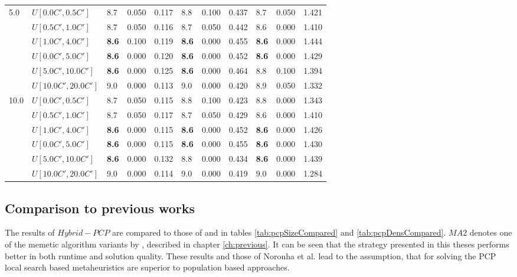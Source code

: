 \begin{table}[h]
{\begin{tabular}{|l|l||l|l|l||l|l|l||l|l|l|}
      \hline\hline
      \multirow{6}{*}{5.0} & $U[0.0C',0.5C']$ & 8.7 & 0.050 & 0.117 & 8.8 & 0.100 & 0.437 & 8.7 & 0.050 & 1.421 \\
       & $U[0.5C',1.0C']$ & 8.7 & 0.050 & 0.116 & 8.7 & 0.050 & 0.442 & 8.6 & 0.000 & 1.410 \\
       & $U[1.0C',4.0C']$ & \textbf{8.6} & 0.100 & 0.119 & \textbf{8.6} & 0.000 & 0.455 & \textbf{8.6} & 0.000 & 1.444 \\
       & $U[0.0C',5.0C']$ & \textbf{8.6} & 0.000 & 0.120 & \textbf{8.6} & 0.000 & 0.452 & \textbf{8.6} & 0.000 & 1.429 \\
       & $U[5.0C',10.0C']$ & \textbf{8.6} & 0.000 & 0.125 & \textbf{8.6} & 0.000 & 0.464 & 8.8 & 0.100 & 1.394 \\
       & $U[10.0C',20.0C']$ & 9.0 & 0.000 & 0.113 & 9.0 & 0.000 & 0.420 & 8.9 & 0.050 & 1.332 \\
      \hline\hline
      \multirow{6}{*}{10.0} & $U[0.0C',0.5C']$ & 8.7 & 0.050 & 0.115 & 8.8 & 0.100 & 0.423 & 8.8 & 0.000 & 1.343 \\
       & $U[0.5C',1.0C']$ & 8.7 & 0.050 & 0.117 & 8.7 & 0.050 & 0.429 & 8.6 & 0.000 & 1.410 \\
       & $U[1.0C',4.0C']$ & \textbf{8.6} & 0.000 & 0.115 & \textbf{8.6} & 0.000 & 0.452 & \textbf{8.6} & 0.000 & 1.426 \\
       & $U[0.0C',5.0C']$ & \textbf{8.6} & 0.000 & 0.115 & \textbf{8.6} & 0.000 & 0.455 & \textbf{8.6} & 0.000 & 1.430 \\
       & $U[5.0C',10.0C']$ & \textbf{8.6} & 0.000 & 0.132 & 8.8 & 0.000 & 0.434 & \textbf{8.6} & 0.000 & 1.439 \\
       & $U[10.0C',20.0C']$ & 9.0 & 0.000 & 0.114 & 9.0 & 0.000 & 0.419 & 9.0 & 0.000 & 1.284 \\
      \hline
      \end{tabular}
      }
      \label{tab:pcpn120RecoloredTT}\end{table}

\clearpage

\subsection{Comparison to previous works}
The results of $\mathit{Hybrid-PCP}$ are compared to those of \cite{frota-07} and \cite{pop-13} in tables \ref{tab:pcpSizeCompared} and \ref{tab:pcpDensCompared}. $\mathit{MA2}$ denotes one of the memetic algorithm variants by \cite{pop-13}, described in chapter \ref{ch:previous}. It can be seen that the strategy presented in this theses performs better in both runtime and solution quality. These results and those of Noronha et al. \cite{noronha-06} lead to the assumption, that for solving the PCP local search based metaheuristics are superior to population based approaches.\\

